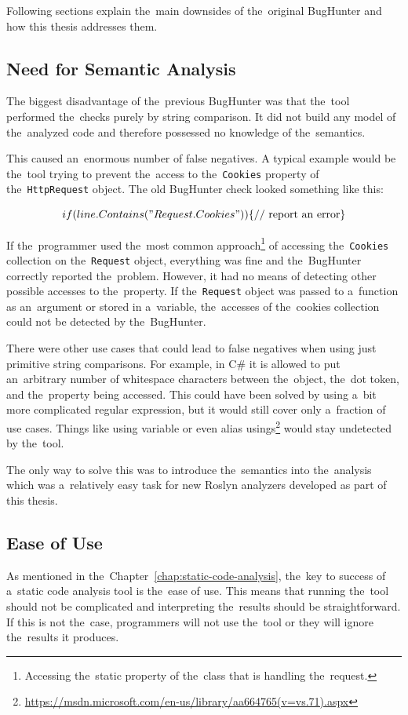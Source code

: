 \documentclass[
  digital, %
  table,   %
  lof,     %
  lot,     %
  oneside,
]{fithesis3}
\begin{document}
Following sections explain the~main downsides of the~original BugHunter and how this thesis addresses them.

\subsection{Need for Semantic Analysis}
The biggest disadvantage of the~previous BugHunter was that the~tool performed the~checks purely by string comparison. It did not build any model of the~analyzed code and therefore possessed no knowledge of the~semantics. 

This caused an~enormous number of false negatives. A typical example would be the~tool trying to prevent the~access to the~\texttt{Cookies} property of the~\texttt{HttpRequest} object. The old BugHunter check looked something like this:

$$
if (line.Contains("Request.Cookies")) \\
\{
  \textnormal{// report an~error}
\}
$$

If the~programmer used the~most common approach\footnote{Accessing the~static property of the~class that is handling the~request.} of accessing the~\texttt{Cookies} collection on the~\texttt{Request} object, everything was fine and the~BugHunter correctly reported the~problem. However, it had no means of detecting other possible accesses to the~property. If the~\texttt{Request} object was passed to a~function as an~argument or stored in a~variable, the~accesses of the~cookies collection could not be detected by the~BugHunter. 

There were other use cases that could lead to false negatives when using just primitive string comparisons. For example, in C\# it is allowed to put an~arbitrary number of whitespace characters between the~object, the~dot token, and the~property being accessed. This could have been solved by using a~bit more complicated regular expression, but it would still cover only a~fraction of use cases. Things like using variable or even alias usings\footnote{\url{https://msdn.microsoft.com/en-us/library/aa664765(v=vs.71).aspx}} would stay undetected by the~tool. 

The only way to solve this was to introduce the~semantics into the~analysis which was a~relatively easy task for new Roslyn analyzers developed as part of this thesis.

\subsection{Ease of Use}
As mentioned in the~Chapter~\ref{chap:static-code-analysis}, the~key to success of a~static code analysis tool is the~ease of use. This means that running the~tool should not be complicated and interpreting the~results should be straightforward. If this is not the~case, programmers will not use the~tool or they will ignore the~results it produces. 
\end{document}
